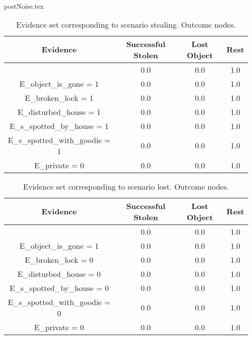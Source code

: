 postNoise.tex\begin{table}\begin{tabular}{c|c|c|c}Evidence & Successful Stolen & Lost Object & Rest \\\hline & 0.0 & 0.0 & 1.0 \\E\_object\_is\_gone = 1 & 0.0 & 0.0 & 1.0 \\E\_broken\_lock = 1 & 0.0 & 0.0 & 1.0 \\E\_disturbed\_house = 1 & 0.0 & 0.0 & 1.0 \\E\_s\_spotted\_by\_house = 1 & 0.0 & 0.0 & 1.0 \\E\_s\_spotted\_with\_goodie = 1 & 0.0 & 0.0 & 1.0 \\E\_private = 0 & 0.0 & 0.0 & 1.0 \\\end{tabular}\caption{Evidence set corresponding to scenario stealing. Outcome nodes.}\end{table}
\begin{table}\begin{tabular}{c|c|c|c}Evidence & Successful Stolen & Lost Object & Rest \\\hline & 0.0 & 0.0 & 1.0 \\E\_object\_is\_gone = 1 & 0.0 & 0.0 & 1.0 \\E\_broken\_lock = 0 & 0.0 & 0.0 & 1.0 \\E\_disturbed\_house = 0 & 0.0 & 0.0 & 1.0 \\E\_s\_spotted\_by\_house = 0 & 0.0 & 0.0 & 1.0 \\E\_s\_spotted\_with\_goodie = 0 & 0.0 & 0.0 & 1.0 \\E\_private = 0 & 0.0 & 0.0 & 1.0 \\\end{tabular}\caption{Evidence set corresponding to scenario lost. Outcome nodes.}\end{table}